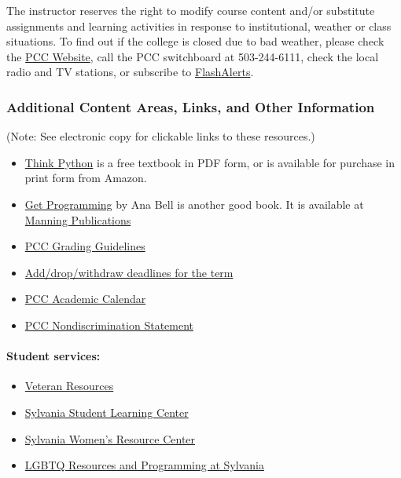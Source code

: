 \documentclass[11pt]{article}
\begin{document}
The instructor reserves the right to modify course content and/or
substitute assignments and learning activities in response to
institutional, weather or class situations. To find out if the college
is closed due to bad weather, please check the
\href{http://www.pcc.edu/}{PCC Website}, call the PCC switchboard at
503-244-6111, check the local radio and TV stations, or subscribe to
\href{https://www.pcc.edu/about/announcements/closure-information.html}{FlashAlerts}.

    \hypertarget{additional-content-areas-links-and-other-information}{%
\subsubsection{Additional Content Areas, Links, and Other
Information}\label{additional-content-areas-links-and-other-information}}

(Note: See electronic copy for clickable links to these resources.)

\begin{itemize}
\item
  \href{http://greenteapress.com/think-python}{Think Python} is a free
  textbook in PDF form, or is available for purchase in print form from
  Amazon.
\item
  \href{https://www.manning.com/books/get-programming}{Get Programming}
  by Ana Bell is another good book. It is available at
  \href{https://www.manning.com/}{Manning Publications}
\item
  \href{http://www.pcc.edu/resources/academic/standards-practices/AcademicStandardsandPractices-GradingGuidelines.html}{PCC
  Grading Guidelines}
\item
  \href{http://www.pcc.edu/registration/dropping.html}{Add/drop/withdraw
  deadlines for the term}
\item
  \href{http://www.pcc.edu/registration/academic-calendar.html}{PCC
  Academic Calendar}
\item
  \href{https://www.pcc.edu/about/equity-inclusion/eeo-statement.html}{PCC
  Nondiscrimination Statement}
\end{itemize}

\hypertarget{student-services}{%
\paragraph{Student services:}\label{student-services}}

\begin{itemize}
\item
  \href{https://www.pcc.edu/resources/veterans/}{Veteran Resources}
\item
  \href{http://www.pcc.edu/resources/tutoring/sylvania/student-success/}{Sylvania
  Student Learning Center}
\item
  \href{https://www.pcc.edu/resources/women/sylvania/}{Sylvania Women's
  Resource Center}
\item
  \href{https://www.pcc.edu/resources/qrc/sylvania/}{LGBTQ Resources and
  Programming at Sylvania}
\end{itemize}
\end{document}
